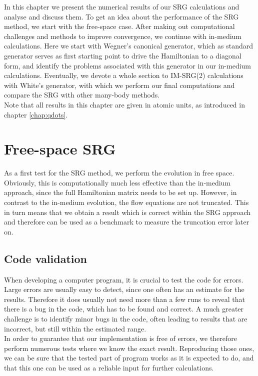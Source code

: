 In this chapter we present the numerical results of our SRG calculations and analyse and discuss them. To get an idea about the performance of the SRG method, we start with the free-space case. After making out computational challenges and methods to improve convergence, we continue with in-medium calculations. 
Here we start with Wegner's canonical generator, which as standard generator serves as first starting point to drive the Hamiltonian to a diagonal form, and identify the problems associated with this generator in our in-medium calculations. Eventually, we devote a whole section to IM-SRG(2) calculations with White's generator, with which we perform our final computations and compare the SRG with other many-body methods.\\
Note that  all results in this chapter are given in atomic units, as introduced in chapter \ref{chap:qdots}.

\section{Free-space SRG}
As a first test for the SRG method, we perform the evolution in free space. Obviously, this is computationally much less effective than the in-medium approach, since the full Hamiltonian matrix needs to be set up. However, in contrast to the in-medium evolution, the flow equations are not truncated. This in turn means that we obtain a result which is correct within the SRG approach and therefore can be used as a benchmark to measure the truncation error later on.

\subsection{Code validation}
When developing a computer program, it is crucial to test the code for errors. Large errors are usually easy to detect, since one often has an estimate for the results. Therefore it does usually not need more than a few runs to reveal that there is a bug in the code, which has to be found and correct. A much greater challenge is to identify minor bugs in the code, often leading to results that are incorrect, but still within the estimated range. \\
In order to guarantee that our implementation is free of errors, we therefore perform numerous tests where we know the exact result. Reproducing those ones, we can be sure that the tested part of program works as it is expected to do, and that this one can be used as a reliable input for further calculations.

